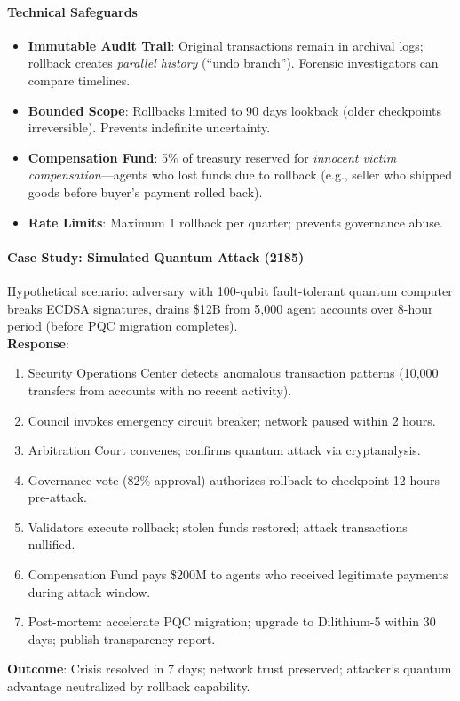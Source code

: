 \documentclass[11pt]{article}
\begin{document}
\paragraph{Technical Safeguards}
\begin{itemize}[noitemsep]
  \item \textbf{Immutable Audit Trail}: Original transactions remain in archival logs; rollback creates \emph{parallel history} (``undo branch''). Forensic investigators can compare timelines.
  \item \textbf{Bounded Scope}: Rollbacks limited to 90 days lookback (older checkpoints irreversible). Prevents indefinite uncertainty.
  \item \textbf{Compensation Fund}: 5\% of treasury reserved for \emph{innocent victim compensation}—agents who lost funds due to rollback (e.g., seller who shipped goods before buyer's payment rolled back).
  \item \textbf{Rate Limits}: Maximum 1 rollback per quarter; prevents governance abuse.
\end{itemize}

\paragraph{Case Study: Simulated Quantum Attack (2185)}
Hypothetical scenario: adversary with 100-qubit fault-tolerant quantum computer breaks ECDSA signatures, drains \$12B from 5,000 agent accounts over 8-hour period (before PQC migration completes).\\
\textbf{Response}:
\begin{enumerate}[noitemsep]
  \item Security Operations Center detects anomalous transaction patterns (10,000 transfers from accounts with no recent activity).
  \item Council invokes emergency circuit breaker; network paused within 2 hours.
  \item Arbitration Court convenes; confirms quantum attack via cryptanalysis.
  \item Governance vote (82\% approval) authorizes rollback to checkpoint 12 hours pre-attack.
  \item Validators execute rollback; stolen funds restored; attack transactions nullified.
  \item Compensation Fund pays \$200M to agents who received legitimate payments during attack window.
  \item Post-mortem: accelerate PQC migration; upgrade to Dilithium-5 within 30 days; publish transparency report.
\end{enumerate}
\textbf{Outcome}: Crisis resolved in 7 days; network trust preserved; attacker's quantum advantage neutralized by rollback capability.
\end{document}

